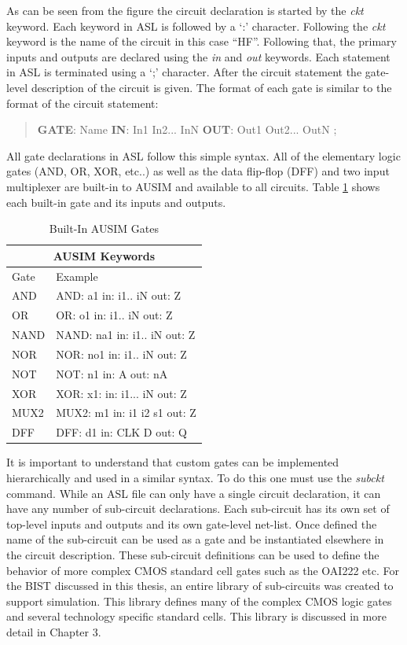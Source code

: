 \documentclass[12pt]{report}
\begin{document}
As can be seen from the figure the circuit declaration is started by the \textit{ckt} keyword\cite{asl}.  Each keyword in ASL is followed by a `:' character\cite{asl}.  Following the \textit{ckt} keyword is the name of the circuit in this case ``HF''.  Following that, the primary inputs and outputs are declared using the \textit{in} and \textit{out} keywords.  Each statement in ASL is terminated using a `;' character\cite{asl}.  After the circuit statement the gate-level description of the circuit is given.  The format of each gate is similar to the format of the circuit statement:
\begin{quote}
	\textbf{GATE}: Name \textbf{IN}: In1 In2... InN \textbf{OUT}: Out1 Out2... OutN ;\cite{asl}
\end{quote}
All gate declarations in ASL follow this simple syntax.  All of the elementary logic gates (AND, OR, XOR, etc..) as well as the data flip-flop (DFF) and two input multiplexer are built-in to AUSIM and available to all circuits\cite{asl}.  Table \ref{tbl:ASLGates} shows each built-in gate and its inputs and outputs.
\begin{table}[bht]
\caption{Built-In AUSIM Gates\cite{asl}}
\begin{center}
\begin{tabular}{|l|l|}
\hline
\multicolumn{2}{|c|}{AUSIM Keywords} \\ \hline
Gate & Example \\ \hline
AND & AND: a1 in: i1.. iN out: Z \\ \hline
OR & OR: o1 in: i1.. iN out: Z \\ \hline
NAND & NAND: na1 in: i1.. iN out: Z \\ \hline
NOR & NOR: no1 in: i1.. iN out: Z \\ \hline
NOT & NOT: n1 in: A out: nA \\ \hline
XOR & XOR: x1: in: i1... iN out: Z \\ \hline
MUX2 & MUX2: m1 in: i1 i2 s1 out: Z \\ \hline
DFF & DFF: d1 in: CLK D out: Q \\ \hline
\end{tabular}
\end{center}
\label{tbl:ASLGates}
\end{table}

It is important to understand that custom gates can be implemented hierarchically and used in a similar syntax.  To do this one must use the \textit{subckt} command.  While an ASL file can only have a single circuit declaration, it can have any number of sub-circuit declarations\cite{asl}.  Each sub-circuit has its own set of top-level inputs and outputs and its own gate-level net-list.  Once defined the name of the sub-circuit can be used as a gate and be instantiated elsewhere in the circuit description.  These sub-circuit definitions can be used to define the behavior of more complex CMOS standard cell gates such as the OAI222 etc.  For the BIST discussed in this thesis, an entire library of sub-circuits was created to support simulation.  This library defines many of the complex CMOS logic gates and several technology specific standard cells.  This library is discussed in more detail in Chapter 3.
\end{document}
